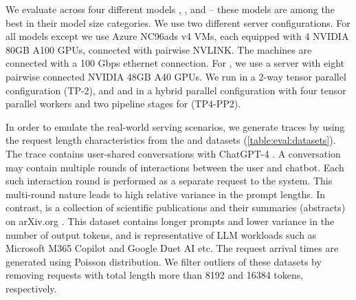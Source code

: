 \begin{table}[b!]
\centering
\setlength{\tabcolsep}{2pt}
\caption{\slos for different model configurations.}
\label{table:eval:slos}
\end{table}

 We evaluate \sysname across four different models \mistral \cite{jiang2023mistral}, \yi \cite{yi}, \llamaL \cite{touvron2023llama} and \falcon \cite{almazrouei2023falcon} -- these models are among the best in their model size categories. We use two different server configurations. For all models except \llamaL we use Azure NC96ads v4 VMs, each equipped with 4 NVIDIA 80GB A100 GPUs, connected with pairwise NVLINK. The machines are connected with a 100 Gbps ethernet connection. For \llamaL, we use a server with eight pairwise connected NVIDIA 48GB A40 GPUs. We run \yi in a 2-way tensor parallel configuration (TP-2), and \llamaL and \falcon in a hybrid parallel configuration with four tensor parallel workers and two pipeline stages for (TP4-PP2).

 In order to emulate the real-world serving scenarios, we generate traces by using the request length characteristics from the \sharegpt \cite{wang2023openchat} and \arxivsum \cite{cohan-etal-2018-discourse} datasets (\autoref{table:eval:datasets}). The \sharegpt trace contains user-shared conversations with ChatGPT-4 \cite{chatgpt}. A conversation may contain multiple rounds of interactions between the user and chatbot. Each such interaction round is performed as a separate request to the system. This multi-round nature leads to high relative variance in the prompt lengths. In contrast, \arxivsum is a collection of scientific publications and their summaries (abstracts) on arXiv.org \cite{arxiv}. This dataset contains longer prompts and lower variance in the  number of output tokens, and is representative of LLM workloads such as Microsoft M365 Copilot \cite{microsoftcopilot} and Google Duet AI \cite{googleduetai} etc. The request arrival times are generated using Poisson distribution. We filter outliers of these datasets by removing requests with total length more than 8192 and 16384 tokens, respectively.



